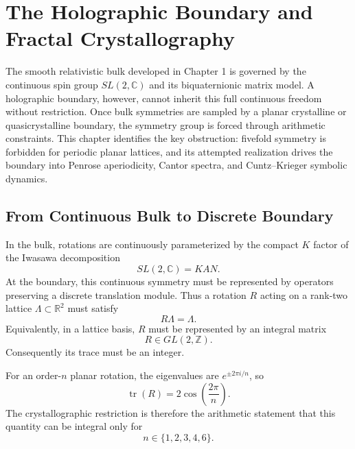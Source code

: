 \chapter{The Holographic Boundary and Fractal Crystallography}

The smooth relativistic bulk developed in Chapter 1 is governed by the continuous spin group $SL(2,\mathbb{C})$ and its biquaternionic matrix model.  A holographic boundary, however, cannot inherit this full continuous freedom without restriction.  Once bulk symmetries are sampled by a planar crystalline or quasicrystalline boundary, the symmetry group is forced through arithmetic constraints.  This chapter identifies the key obstruction: fivefold symmetry is forbidden for periodic planar lattices, and its attempted realization drives the boundary into Penrose aperiodicity, Cantor spectra, and Cuntz--Krieger symbolic dynamics.

\section{From Continuous Bulk to Discrete Boundary}

In the bulk, rotations are continuously parameterized by the compact $K$ factor of the Iwasawa decomposition
\begin{equation}
    SL(2,\mathbb{C}) = KAN.
\end{equation}
At the boundary, this continuous symmetry must be represented by operators preserving a discrete translation module.  Thus a rotation $R$ acting on a rank-two lattice $\Lambda\subset\mathbb{R}^2$ must satisfy
\begin{equation}
    R\Lambda=\Lambda.
\end{equation}
Equivalently, in a lattice basis, $R$ must be represented by an integral matrix
\begin{equation}
    R\in GL(2,\mathbb{Z}).
\end{equation}
Consequently its trace must be an integer.

For an order-$n$ planar rotation, the eigenvalues are $e^{\pm 2\pi i/n}$, so
\begin{equation}
    \operatorname{tr}(R)=2\cos\left(\frac{2\pi}{n}\right).
\end{equation}
The crystallographic restriction is therefore the arithmetic statement that this quantity can be integral only for
\begin{equation}
    n\in\{1,2,3,4,6\}.
\end{equation}

